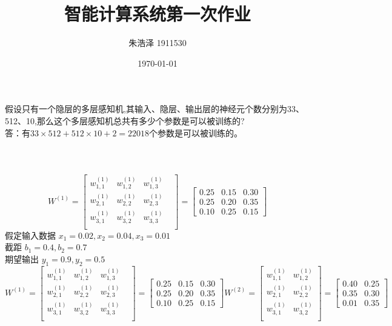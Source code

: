 \documentclass{homework}
\author{朱浩泽 1911530}
\date{\today}
\title{\Large{智能计算系统第一次作业}}
\begin{document}
 \maketitle

\question \large{假设只有一个隐层的多层感知机,其输入、隐层、输出层的神经元个数分别为33、512、10,那么这个多层感知机总共有多少个参数是可以被训练的?}\\

\normalsize
答：有$33\times 512+512\times 10 +2 = 22018$个参数是可以被训练的。
\\ 
\\ 
\\ 
\\ 


\question \large{
	$$
	W^{(1)} = 
	\begin{bmatrix}
		w^{(1)}_{1, 1}& w^{(1)}_{1, 2}& w^{(1)}_{1, 3}&\\
		w^{(1)}_{2, 1}& w^{(1)}_{2, 2}& w^{(1)}_{2, 3}&\\
		w^{(1)}_{3, 1}& w^{(1)}_{3, 2}& w^{(1)}_{3, 3}&\\
	\end{bmatrix}
	= 
	\begin{bmatrix}
		0.25& 0.15& 0.30\\
		0.25& 0.20& 0.35\\
		0.10& 0.25& 0.15
	\end{bmatrix}
	$$
	假定输入数据 $x_1 = 0.02, x_2 = 0.04, x_3 = 0.01$\\
	截距 $b_1 = 0.4, b_2 = 0.7$\\
	期望输出 $y_1 = 0.9, y_2 = 0.5$
$$
W^{(1)} = 
\begin{bmatrix}
	w^{(1)}_{1, 1}& w^{(1)}_{1, 2}& w^{(1)}_{1, 3}&\\
	w^{(1)}_{2, 1}& w^{(1)}_{2, 2}& w^{(1)}_{2, 3}&\\
	w^{(1)}_{3, 1}& w^{(1)}_{3, 2}& w^{(1)}_{3, 3}&\\
\end{bmatrix}
= 
\begin{bmatrix}
	0.25& 0.15& 0.30\\
	0.25& 0.20& 0.35\\
	0.10& 0.25& 0.15
\end{bmatrix}
W^{(2)} = 
\begin{bmatrix}
	w^{(1)}_{1, 1}& w^{(1)}_{1, 2}\\
	w^{(1)}_{2, 1}& w^{(1)}_{2, 2}\\
	w^{(1)}_{3, 1}& w^{(1)}_{3, 2}\\
\end{bmatrix}
= 
\begin{bmatrix}
	0.40& 0.25\\
	0.35& 0.30\\
	0.01& 0.35
\end{bmatrix}
$$
}\\ 
\end{document}
